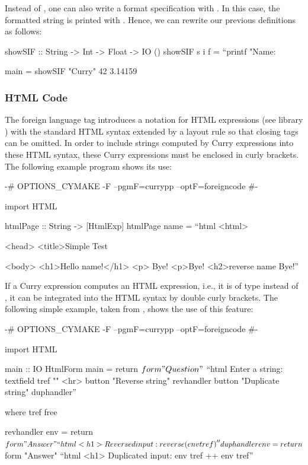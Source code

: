 Instead of , one can also write a format specification
with . In this case, the formatted string is
printed with . Hence, we can rewrite our previous definitions
as follows:
\begin{curry}
showSIF :: String -> Int -> Float -> IO ()
showSIF s i f = ``printf "Name: %

main = showSIF "Curry" 42 3.14159
\end{curry}


\subsubsection{HTML Code}

The foreign language tag  introduces a notation
for HTML expressions (see \CYS library )
with the standard HTML syntax extended by a layout rule
so that closing tags can be omitted.
In order to include strings computed by Curry expressions
into these HTML syntax, these Curry expressions must be enclosed
in curly brackets.
The following example program shows its use:
\begin{curry}
{-# OPTIONS_CYMAKE -F --pgmF=currypp --optF=foreigncode #-}

import HTML

htmlPage :: String -> [HtmlExp]
htmlPage name = ``html
 <html>

  <head>
   <title>Simple Test

  <body>
   <h1>Hello {name}!</h1>
    <p>
     Bye!
    <p>Bye!
   <h2>{reverse name}
   Bye!''
\end{curry}
%
If a Curry expression computes an HTML expression,
i.e., it is of type  instead of ,
it can be integrated into the HTML syntax by double curly brackets.
The following simple example, taken from \cite{Hanus01PADL},
shows the use of this feature:

\begin{currynomath}
{-# OPTIONS_CYMAKE -F --pgmF=currypp --optF=foreigncode #-}

import HTML

main :: IO HtmlForm
main = return $ form "Question" $
         ``html
	     Enter a string: {{textfield tref ""}}
	     <hr>
             {{button "Reverse string"   revhandler}}
             {{button "Duplicate string" duphandler}}''

 where
  tref free

  revhandler env = return $ form "Answer"
    ``html <h1>Reversed input: {reverse (env tref)}''

  duphandler env = return $ form "Answer"
    ``html
       <h1>
         Duplicated input:
         {env tref ++ env tref}''
\end{currynomath}


